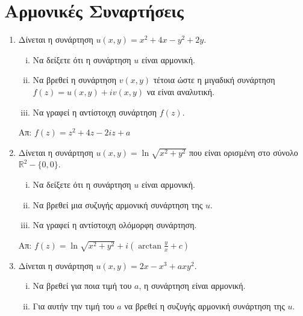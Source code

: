 



\pagestyle{askhseis}
\everymath{\displaystyle}



\begin{center}
  \minibox{\large\bfseries \textcolor{Col1}{Ασκήσεις Ολοκληρώματα}}
\end{center}

\vspace{\baselineskip} 


\section*{Αρμονικές Συναρτήσεις}

\begin{enumerate}

  \item Δίνεται η συνάρτηση $ u(x,y) = x^{2} +4x-y^{2}+2y $. 
    \begin{enumerate}[i)]
      \item Να δείξετε ότι η συνάρτηση $ u $ είναι αρμονική.
      \item Να βρεθεί η συνάρτηση $ v(x,y) $ τέτοια ώστε η μιγαδική συνάρτηση 
        $ f(z) = u(x,y) + iv(x,y) $ να είναι αναλυτική. 
      \item Να γραφεί η αντίστοιχη συνάρτηση $ f(z) $.
    \end{enumerate}

    \hfill Απ: $ f(z) = z^{2}+4z-2iz+a $ 

  \item Δίνεται η συνάρτηση $ u(x,y) = \ln{\sqrt{x^{2}+y^{2}}} $ που είναι ορισμένη 
    στο σύνολο $ \mathbb{R}^{2}- \{ 0,0 \} $. 
    \begin{enumerate}[i)]
      \item Να δείξετε ότι η συνάρτηση $ u $ είναι αρμονική.
      \item Να βρεθεί μια συζυγής αρμονική συνάρτηση της $u$.
      \item Να γραφεί η αντίστοιχη ολόμορφη συνάρτηση.
    \end{enumerate}

    \hfill Απ: $ f(z) = \ln{\sqrt{x^{2}+y^{2}}} + i(\arctan{\frac{y}{x}} + c)  $ 

  \item Δίνεται η συνάρτηση $ u(x,y) = 2x-x^{3}+axy^{2} $. 
    \begin{enumerate}[i)]
      \item Να βρεθεί για ποια τιμή του $a$, η συνάρτηση είναι αρμονική. 
      \item Για αυτήν την τιμή του $a$ να βρεθεί η συζυγής αρμονική συνάρτηση της $u$.
    \end{enumerate} 


\end{enumerate}
